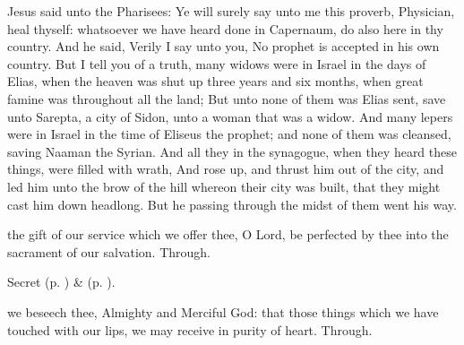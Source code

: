 
 Jesus said unto the Pharisees: Ye will surely say unto me this proverb, Physician, heal thyself: whatsoever we have heard done in Capernaum, do also here in thy country. And he said, Verily I say unto you, No prophet is accepted in his own country. But I tell you of a truth, many widows were in Israel in the days of Elias, when the heaven was shut up three years and six months, when great famine was throughout all the land; But unto none of them was Elias sent, save unto Sarepta, a city of Sidon, unto a woman that was a widow. And many lepers were in Israel in the time of Eliseus the prophet; and none of them was cleansed, saving Naaman the Syrian. And all they in the synagogue, when they heard these things, were filled with wrath, And rose up, and thrust him out of the city, and led him unto the brow of the hill whereon their city was built, that they might cast him down headlong. But he passing through the midst of them went his way.


\secret
{} the gift of our service which we offer thee, O Lord, be perfected by thee into the sacrament of our salvation. Through.


\begin{rubric}
     Secret  (p. \pageref{AshWednesdayMassSecret}) \&   (p. \pageref{SPLivingDeparted}).
\end{rubric}


\postcommunion
{} we beseech thee, Almighty and Merciful God: that those things which we have touched with our lips, we may receive in purity of heart. Through.

